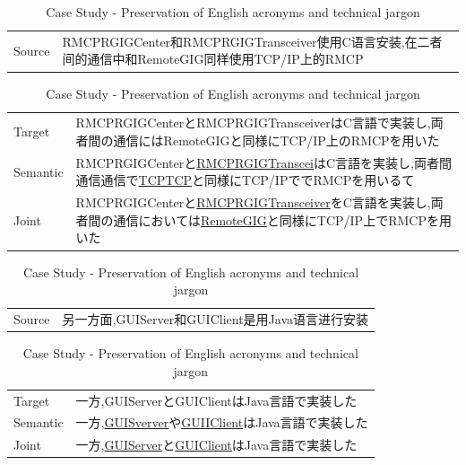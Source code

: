 \vspace{0.1cm}
\begin{table}[h]
    \centering

    \begin{CJK}{UTF8}{gbsn}
        \begin{tabularx}{\textwidth}{p{1.2cm}b}\toprule
            Source & RMCPRGIGCenter和RMCPRGIGTransceiver使用C语言安装,在二者间的通信中和RemoteGIG同样使用TCP/IP上的RMCP \\
        \end{tabularx}
    \end{CJK}

    \begin{CJK}{UTF8}{ipxm}
        \begin{tabularx}{\textwidth}{p{1.2cm}b}
            Target & RMCPRGIGCenterとRMCPRGIGTransceiverはC言語で実装し,両者間の通信にはRemoteGIGと同様にTCP/IP上のRMCPを用いた \\
            Semantic & RMCPRGIGCenterと\underline{RMCPRGIGTranscei}はC言語を実装し,両者間通信通信で\underline{TCPTCP}と同様にTCP/IPででRMCPを用いるて \\
            Joint & RMCPRGIGCenterと\underline{RMCPRGIGTransceiver}をC言語を実装し,両者間の通信においては\underline{RemoteGIG}と同様にTCP/IP上でRMCPを用いた \\\midrule
        \end{tabularx}
    \end{CJK}

    \begin{CJK}{UTF8}{gbsn}
        \begin{tabularx}{\textwidth}{p{1.2cm}b}
            Source & 另一方面,GUIServer和GUIClient是用Java语言进行安装 \\
        \end{tabularx}
    \end{CJK}

    \begin{CJK}{UTF8}{ipxm}
        \begin{tabularx}{\textwidth}{p{1.2cm}b}
            Target & 一方,GUIServerとGUIClientはJava言語で実装した \\
            Semantic & 一方,\underline{GUISverver}や\underline{GUIIClient}はJava言語で実装した \\
            Joint & 一方,\underline{GUIServer}と\underline{GUIClient}はJava言語で実装した \\\midrule
        \end{tabularx}
    \end{CJK}

    \caption{Case Study - Preservation of English acronyms and technical jargon}
    \label{tab:case_study3}
\end{table}


